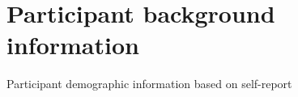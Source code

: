 \documentclass[]{elsarticle} %
\begin{document}
\clearpage

\appendix

\hypertarget{participant-background-information}{%
\section{Participant background
information}\label{participant-background-information}}

\label{section:a}

\begin{table}[hbt!]

\begin{center}
\begin{threeparttable}

\caption{\label{tab:unnamed-chunk-2}Participant demographic information based on self-report}

\small{

}
\end{threeparttable}
\end{center}
\end{table}
\end{document}
